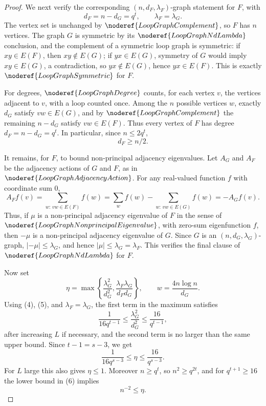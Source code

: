 \begin{proof}
We next verify the corresponding \((n,d_F,\lambda_F)\)-graph statement for \(F\), with
\[
  d_F=n-d_G=q^t,\qquad \lambda_F=\lambda_G.
\]
The vertex set is unchanged by \(\noderef{LoopGraphComplement}\), so \(F\) has \(n\) vertices. The graph \(G\) is symmetric by its \(\noderef{LoopGraphNdLambda}\) conclusion, and the complement of a symmetric loop graph is symmetric: if \(xy\in E(F)\), then \(xy\notin E(G)\); if \(yx\in E(G)\), symmetry of \(G\) would imply \(xy\in E(G)\), a contradiction, so \(yx\notin E(G)\), hence \(yx\in E(F)\). This is exactly \(\noderef{LoopGraphSymmetric}\) for \(F\).

For degrees, \(\noderef{LoopGraphDegree}\) counts, for each vertex \(v\), the vertices adjacent to \(v\), with a loop counted once. Among the \(n\) possible vertices \(w\), exactly \(d_G\) satisfy \(vw\in E(G)\), and by \(\noderef{LoopGraphComplement}\) the remaining \(n-d_G\) satisfy \(vw\in E(F)\). Thus every vertex of \(F\) has degree \(d_F=n-d_G=q^t\). In particular, since \(n\le2q^t\),
\[
  d_F\ge n/2. \tag{5}
\]

It remains, for \(F\), to bound non-principal adjacency eigenvalues. Let \(A_G\) and \(A_F\) be the adjacency actions of \(G\) and \(F\), as in \(\noderef{LoopGraphAdjacencyAction}\). For any real-valued function \(f\) with coordinate sum \(0\),
\[
  A_F f(v)=\sum_{w:\,vw\in E(F)}f(w)
          =\sum_w f(w)-\sum_{w:\,vw\in E(G)}f(w)
          =-A_G f(v).
\]
Thus, if \(\mu\) is a non-principal adjacency eigenvalue of \(F\) in the sense of \(\noderef{LoopGraphNonprincipalEigenvalue}\), with zero-sum eigenfunction \(f\), then \(-\mu\) is a non-principal adjacency eigenvalue of \(G\). Since \(G\) is an \((n,d_G,\lambda_G)\)-graph, \(|-\mu|\le\lambda_G\), and hence \(|\mu|\le\lambda_G=\lambda_F\). This verifies the final clause of \(\noderef{LoopGraphNdLambda}\) for \(F\).

Now set
\[
  \eta=\max\left\{\frac{\lambda_G^2}{d_G^2},
  \frac{\lambda_F\lambda_G}{d_Fd_G}\right\},
  \qquad
  w=\frac{4n\log n}{d_G}.
\]
Using (4), (5), and \(\lambda_F=\lambda_G\), the first term in the maximum satisfies
\[
  \frac{1}{16q^{t-1}}\le
  \frac{\lambda_G^2}{d_G^2}
  \le
  \frac{16}{q^{t-1}},
\]
after increasing \(L\) if necessary, and the second term is no larger than the same upper bound. Since \(t-1=s-3\), we get
\[
  \frac{1}{16q^{s-3}}\le \eta\le \frac{16}{q^{s-3}}. \tag{6}
\]
For \(L\) large this also gives \(\eta\le1\). Moreover \(n\ge q^t\), so \(n^2\ge q^{2t}\), and for \(q^{t+1}\ge16\) the lower bound in (6) implies
\[
  n^{-2}\le \eta. \tag{7}
\]


\end{proof}
